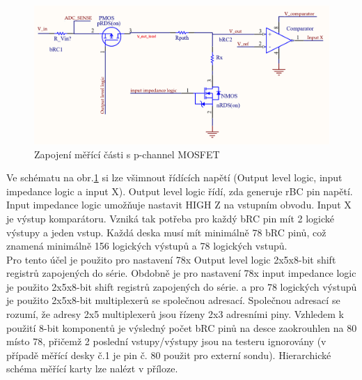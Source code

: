 \begin{figure}[ht!]
        \centering
        \includegraphics[width = 1\textwidth]{obrazky/final_connection.png}
        \caption{Zapojení měřící části s p-channel MOSFET}
        \label{fig:Zapojení měřící části s p-channel MOSFET}
\end{figure}

    Ve schématu na obr.\ref{fig:Zapojení měřící části s p-channel MOSFET}
    si lze všimnout řídících napětí (Output level logic, input impedance logic a input X).
    Output level logic řídí, zda generuje rBC pin napětí.
    Input impedance logic umožňuje nastavit HIGH Z na vstupním obvodu. Input X je výstup komparátoru. Vzniká
    tak potřeba pro každý bRC pin mít 2 logické výstupy a jeden vstup. Každá deska musí mít minimálně 78 bRC pinů,
    což znamená minimálně 156 logických výstupů a 78 logických vstupů.\\

    Pro tento účel je použito pro nastavení 78x Output level logic 2x5x8-bit shift registrů zapojených do série.
    Obdobně je pro nastavení 78x input impedance logic je použito 2x5x8-bit shift registrů zapojených do série.
    a pro 78 logických výstupů je použito 2x5x8-bit multiplexerů se společnou adresací.
    Společnou adresací se rozumí, že adresy 2x5 multiplexerů jsou řízeny 2x3 adresními piny.
    Vzhledem k použití 8-bit komponentů je výsledný počet bRC pinů na desce zaokrouhlen na 80 místo 78,
    přičemž 2 poslední vstupy/výstupy jsou na testeru ignorovány
    (v případě měřící desky č.1 je pin č. 80 použit pro externí sondu). 
    Hierarchické schéma měřící karty lze nalézt v příloze.\\

